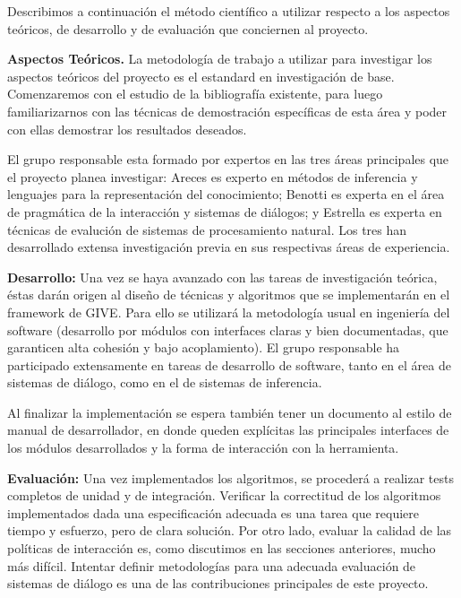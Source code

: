 
Describimos a continuaci\'on el m\'etodo cient\'ifico a utilizar
respecto a los aspectos te\'oricos, de desarrollo y de evaluaci\'on
que conciernen al proyecto.

\begin{myitemize}
\item \textbf{Aspectos Te\'oricos.}
La metodolog\'ia de trabajo a utilizar para investigar los aspectos
te\'oricos del proyecto es el estandard en investigaci\'on de base.
Comenzaremos con el estudio de la bibliograf\'ia existente, para luego
familiarizarnos con las t\'ecnicas de demostraci\'on espec\'ificas de esta
\'area y poder con ellas demostrar los resultados deseados.

El grupo
responsable esta formado por expertos en las tres \'areas principales
que el proyecto planea investigar: Areces es
experto en m\'etodos de inferencia y lenguajes para la representaci\'on del
conocimiento; Benotti es experta en el \'area de
pragm\'atica de la interacci\'on y sistemas de di\'alogos; y Estrella es experta en t\'ecnicas
de evaluci\'on de sistemas de procesamiento natural.
Los tres han desarrollado extensa investigaci\'on previa en sus respectivas
\'areas
de experiencia.

\item \textbf{Desarrollo:}
Una vez se haya avanzado con las tareas de investigaci\'on te\'orica,
\'estas dar\'an origen al dise\~no de t\'ecnicas y algoritmos que se
implementar\'an en el framework de GIVE. Para ello se utilizar\'a la
metodolog\'ia
usual en ingenier\'ia del software (desarrollo por
m\'odulos con interfaces claras y bien documentadas,
que garanticen alta cohesi\'on y bajo acoplamiento).  El grupo
responsable ha participado extensamente en tareas de desarrollo de
software, tanto en el \'area de sistemas de di\'alogo, como en el
de sistemas de inferencia.

Al finalizar la implementaci\'on
se espera tambi\'en tener un documento al estilo de manual de
desarrollador, en donde queden expl\'icitas las principales interfaces
de los m\'odulos desarrollados y la forma de interacci\'on con la
herramienta.


\item \textbf{Evaluaci\'on:}
Una vez implementados los algoritmos, se proceder\'a a realizar tests
completos de unidad y de integraci\'on.  Verificar la correctitud de los
algoritmos implementados dada una especificaci\'on adecuada es una
tarea que requiere tiempo y esfuerzo, pero de clara soluci\'on.  Por otro lado, evaluar la calidad de las pol\'iticas de interacci\'on es, como
discutimos en las secciones anteriores, mucho m\'as dif\'icil.  Intentar
definir metodolog\'ias para una adecuada evaluaci\'on de sistemas de
di\'alogo es una de las contribuciones principales de este proyecto.


\end{myitemize}
